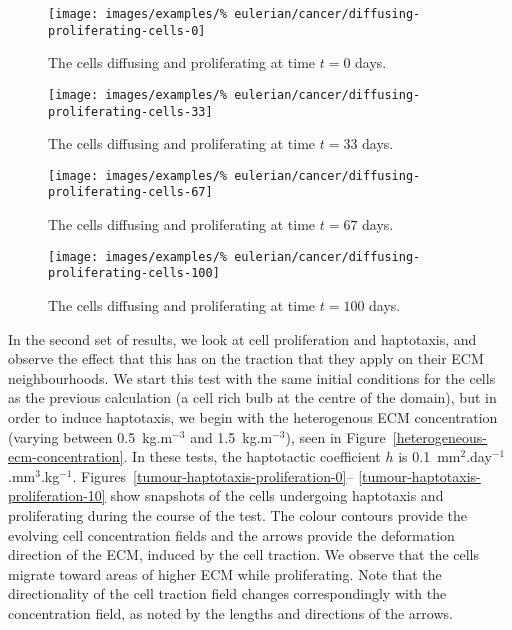 \clearpage

\begin{figure}[!hptb]
\centering
\texttt{[image: images/examples/\%
eulerian/cancer/diffusing-proliferating-cells-0]}
\caption{The cells diffusing and proliferating at time $t=0$ days.}
\label{tumour-diffusion-proliferation-0}
\end{figure}

\begin{figure}[!hptb]
\centering
\texttt{[image: images/examples/\%
eulerian/cancer/diffusing-proliferating-cells-33]}
\caption{The cells diffusing and proliferating at time $t=33$ days.}
\label{tumour-diffusion-proliferation-33}
\end{figure}

\begin{figure}[!hptb]
\centering
\texttt{[image: images/examples/\%
eulerian/cancer/diffusing-proliferating-cells-67]}
\caption{The cells diffusing and proliferating at time $t=67$ days.}
\label{tumour-diffusion-proliferation-67}
\end{figure}

\begin{figure}[!hptb]
\centering
\texttt{[image: images/examples/\%
eulerian/cancer/diffusing-proliferating-cells-100]}
\caption{The cells diffusing and proliferating at time $t=100$ days.}
\label{tumour-diffusion-proliferation-100}
\end{figure}

\clearpage

In the second set of results, we look at cell proliferation and
haptotaxis, and observe the effect that this has on the traction that
they apply on their ECM neighbourhoods. We start this test with the
same initial conditions for the cells as the previous calculation (a
cell rich bulb at the centre of the domain), but in order to induce
haptotaxis, we begin with the heterogenous ECM concentration (varying
between 0.5~kg.m$^{-3}$ and 1.5~kg.m$^{-3}$), seen in
Figure~\ref{heterogeneous-ecm-concentration}. In these tests, the
haptotactic coefficient $h$ is 0.1~mm$^2$.day$^{-1}$.mm$^3$.kg$^{-1}$.
Figures~\ref{tumour-haptotaxis-proliferation-0}--%
\ref{tumour-haptotaxis-proliferation-10} show snapshots of the cells
undergoing haptotaxis and proliferating during the course of the
test. The colour contours provide the evolving cell concentration
fields and the arrows provide the deformation direction of the ECM,
induced by the cell traction. We observe that the cells migrate toward
areas of higher ECM while proliferating. Note that the directionality
of the cell traction field changes correspondingly with the
concentration field, as noted by the lengths and directions of the
arrows.

